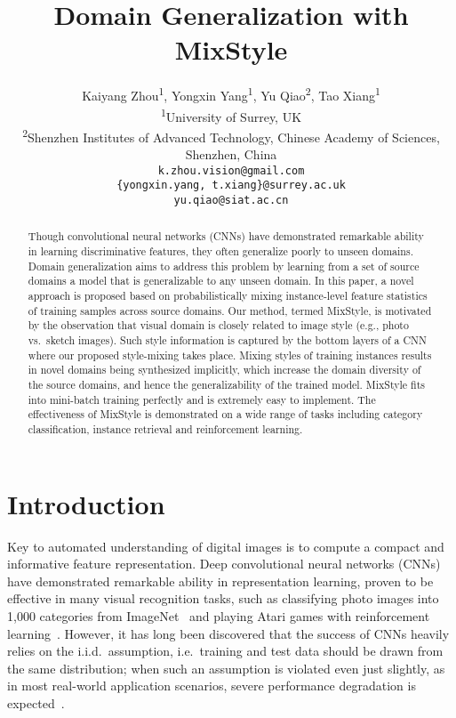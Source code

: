 \documentclass{article} \usepackage{iclr2021_conference,times}
\title{Domain Generalization with MixStyle}
\author{Kaiyang Zhou\textsuperscript{1}, Yongxin Yang\textsuperscript{1}, Yu Qiao\textsuperscript{2}, Tao Xiang\textsuperscript{1} \\
\textsuperscript{1}University of Surrey, UK \\
\textsuperscript{2}Shenzhen Institutes of Advanced Technology, Chinese Academy of Sciences, Shenzhen, China \\
\texttt{k.zhou.vision@gmail.com} \\
\texttt{\{yongxin.yang, t.xiang\}@surrey.ac.uk} \\ \texttt{yu.qiao@siat.ac.cn}
}
\begin{document}
\maketitle

\begin{abstract}
Though convolutional neural networks (CNNs) have demonstrated remarkable ability in learning discriminative features, they often generalize poorly to unseen domains. Domain generalization aims to address this problem by learning from a set of source domains a model that is generalizable to any unseen domain. In this paper, a novel approach is proposed based on probabilistically mixing instance-level feature statistics of training samples across source domains. Our method, termed MixStyle, is motivated by the observation that visual domain is closely related to image style (e.g., photo vs.~sketch images). Such style information is captured by the bottom layers of a CNN where our proposed style-mixing takes place. Mixing styles of training instances results in novel domains being synthesized implicitly, which increase the domain diversity of the source domains, and hence the generalizability of the trained model. MixStyle fits into mini-batch training perfectly and is extremely easy to implement. The effectiveness of MixStyle is demonstrated on a wide range of tasks including category classification, instance retrieval and reinforcement learning.
\end{abstract}


\section{Introduction}

Key to automated understanding of digital images is to compute a compact and informative feature representation. Deep convolutional neural networks (CNNs) have demonstrated remarkable ability in representation learning, proven to be effective in many visual recognition tasks, such as classifying photo images into 1,000 categories from ImageNet~\citep{krizhevsky2012imagenet} and playing Atari games with reinforcement learning~\citep{mnih2013playing}. However, it has long been discovered that the success of CNNs heavily relies on the i.i.d.~assumption, i.e.~training and test data should be drawn from the same distribution; when such an assumption is violated even just slightly, as in most real-world application scenarios, severe performance degradation is expected~\citep{hendrycks2019robustness,recht2019imagenet}.
\end{document}
